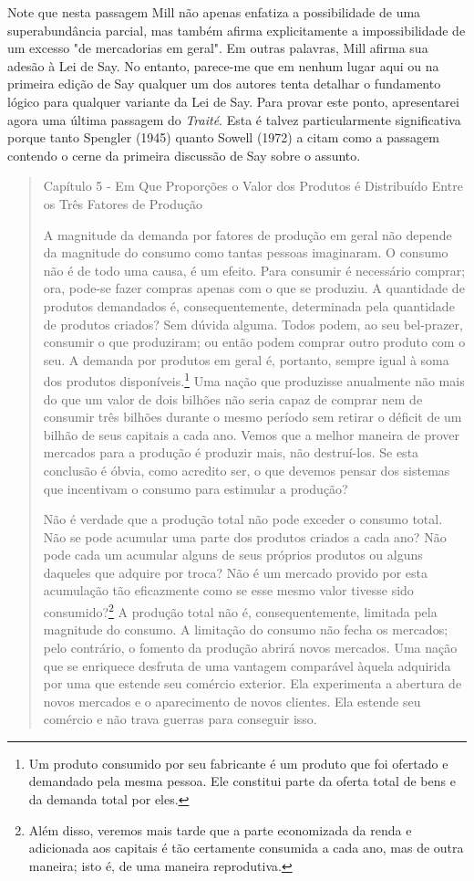 \documentclass[12pt]{article}
\begin{document}
Note que nesta passagem Mill não apenas enfatiza a possibilidade de uma superabundância parcial, mas também afirma explicitamente a impossibilidade de um excesso "de mercadorias em geral". Em outras palavras, Mill afirma sua adesão à Lei de Say. No entanto, parece-me que em nenhum lugar aqui ou na primeira edição de Say qualquer um dos autores tenta detalhar o fundamento lógico para qualquer variante da Lei de Say. Para provar este ponto, apresentarei agora uma última passagem do \textit{Traité}. Esta é talvez particularmente significativa porque tanto Spengler (1945) quanto Sowell (1972) a citam como a passagem contendo o cerne da primeira discussão de Say sobre o assunto.

\begin{quote}
Capítulo 5 - Em Que Proporções o Valor dos Produtos é Distribuído Entre os Três Fatores de Produção

A magnitude da demanda por fatores de produção em geral não depende da magnitude do consumo como tantas pessoas imaginaram. O consumo não é de todo uma causa, é um efeito. Para consumir é necessário comprar; ora, pode-se fazer compras apenas com o que se produziu. A quantidade de produtos demandados é, consequentemente, determinada pela quantidade de produtos criados? Sem dúvida alguma. Todos podem, ao seu bel-prazer, consumir o que produziram; ou então podem comprar outro produto com o seu. A demanda por produtos em geral é, portanto, sempre igual à soma dos produtos disponíveis.\footnote{Um produto consumido por seu fabricante é um produto que foi ofertado e demandado pela mesma pessoa. Ele constitui parte da oferta total de bens e da demanda total por eles.} Uma nação que produzisse anualmente não mais do que um valor de dois bilhões não seria capaz de comprar nem de consumir três bilhões durante o mesmo período sem retirar o déficit de um bilhão de seus capitais a cada ano. Vemos que a melhor maneira de prover mercados para a produção é produzir mais, não destruí-los. Se esta conclusão é óbvia, como acredito ser, o que devemos pensar dos sistemas que incentivam o consumo para estimular a produção?

Não é verdade que a produção total não pode exceder o consumo total. Não se pode acumular uma parte dos produtos criados a cada ano? Não pode cada um acumular alguns de seus próprios produtos ou alguns daqueles que adquire por troca? Não é um mercado provido por esta acumulação tão eficazmente como se esse mesmo valor tivesse sido consumido?\footnote{Além disso, veremos mais tarde que a parte economizada da renda e adicionada aos capitais é tão certamente consumida a cada ano, mas de outra maneira; isto é, de uma maneira reprodutiva.} A produção total não é, consequentemente, limitada pela magnitude do consumo. A limitação do consumo não fecha os mercados; pelo contrário, o fomento da produção abrirá novos mercados. Uma nação que se enriquece desfruta de uma vantagem comparável àquela adquirida por uma que estende seu comércio exterior. Ela experimenta a abertura de novos mercados e o aparecimento de novos clientes. Ela estende seu comércio e não trava guerras para conseguir isso.


\end{quote}
\end{document}
